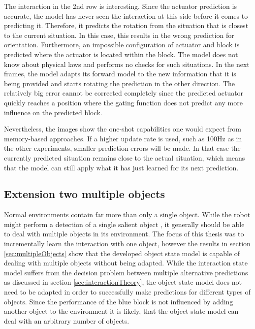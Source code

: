 The interaction in the 2nd row is interesting. Since the actuator prediction is accurate, the model has never seen the interaction at this side before it comes to predicting it. Therefore, it predicts the rotation from the situation that is closest to the current situation. In this case, this results in the wrong prediction for orientation.
Furthermore, an impossible configuration of actuator and block is predicted where the actuator is located within the block. The model does not know about physical laws and performs no checks for such situations.
In the next frames, the model adapts its forward model to the new information that it is being provided and starts rotating the prediction in the other direction. The relatively big error cannot be corrected completely since the predicted actuator quickly reaches a position where the gating function does not predict any more influence on the predicted block. 

Nevertheless, the images show the one-shot capabilities one would expect from memory-based approaches. If a higher update rate is used, such as 100Hz as in the other experiments, smaller prediction errors will be made. In that case the currently predicted situation remains close to the actual situation, which means that the model can still apply what it has just learned for its next prediction.


\subsection{Extension two multiple objects}

Normal environments contain far more than only a single object. While the robot might perform a detection of a single salient object \cite{salient}, it generally should be able to deal with multiple objects in its environment. The focus of this thesis was to incrementally learn the interaction with one object, however the results in section \ref{sec:multipleObjects} show that the developed object state model is capable of dealing with multiple objects without being adapted.
While the interaction state model suffers from the decision problem between multiple alternative predictions as discussed in section \ref{sec:interactionTheory}, the object state model does not need to be adapted in order to successfully make predictions for different types of objects. Since the performance of the blue block is not influenced by adding another object to the environment it is likely, that the object state model can deal with an arbitrary number of objects.

